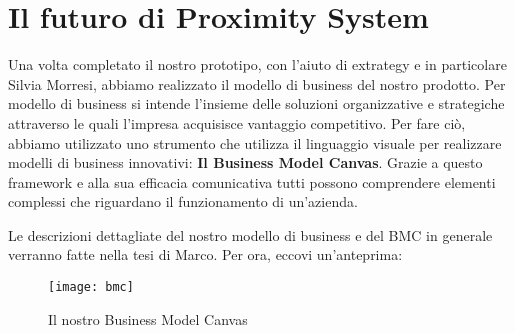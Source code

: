     
\section{Il futuro di Proximity System}

Una volta completato il nostro prototipo, con l'aiuto di extrategy e in particolare Silvia Morresi, abbiamo realizzato il modello di business del nostro prodotto.
Per modello di business si intende l'insieme delle soluzioni organizzative e strategiche attraverso le quali l'impresa acquisisce vantaggio competitivo.
Per fare ciò, abbiamo utilizzato uno strumento che utilizza il linguaggio visuale per realizzare modelli di business innovativi: \textbf{Il Business Model Canvas}.
Grazie a questo framework e alla sua efficacia comunicativa tutti possono comprendere elementi complessi che riguardano il funzionamento di un'azienda.

Le descrizioni dettagliate del nostro modello di business e del BMC in generale verranno fatte nella tesi di Marco. 
Per ora, eccovi un'anteprima:
\begin{figure}[htpb!]
  \centering
  \texttt{[image: bmc]}
  \caption{Il nostro Business Model Canvas}
  \label{fig:bmc}
\end{figure}
